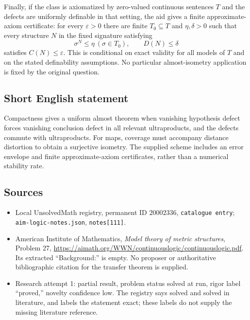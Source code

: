 \documentclass[11pt]{article}
\begin{document}
Finally, if the class is axiomatized by zero-valued continuous sentences $T$ and the defects are uniformly definable in that setting, the aid gives a finite approximate-axiom certificate: for every $\varepsilon>0$ there are finite $T_0\subseteq T$ and $\eta,\delta>0$ such that every structure $N$ in the fixed signature satisfying
\[
\sigma^N\leq\eta\ (\sigma\in T_0),\qquad D(N)\leq\delta
\]
satisfies $C(N)\leq\varepsilon$. This is conditional on exact validity for all models of $T$ and on the stated definability assumptions. No particular almost-isometry application is fixed by the original question.
\subsection{Short English statement}
Compactness gives a uniform almost theorem when vanishing hypothesis defect forces vanishing conclusion defect in all relevant ultraproducts, and the defects commute with ultraproducts. For maps, coverage must accompany distance distortion to obtain a surjective isometry. The supplied scheme includes an error envelope and finite approximate-axiom certificates, rather than a numerical stability rate.
\subsection{Sources}
\begin{itemize}
\item Local UnsolvedMath registry, permanent ID $20002336$, \texttt{catalogue entry}; \texttt{aim-logic-notes.json}, \texttt{notes[111]}.
\item American Institute of Mathematics, \emph{Model theory of metric structures}, Problem 27, \url{https://aimath.org/WWN/continuouslogic/continuouslogic.pdf}. Its extracted ``Background:'' is empty. No proposer or authoritative bibliographic citation for the transfer theorem is supplied.
\item Research attempt 1: partial result, problem status solved at run, rigor label ``proved,'' novelty confidence low. The registry says solved and solved in literature, and labels the statement exact; these labels do not supply the missing literature reference.
\end{itemize}
\end{document}
